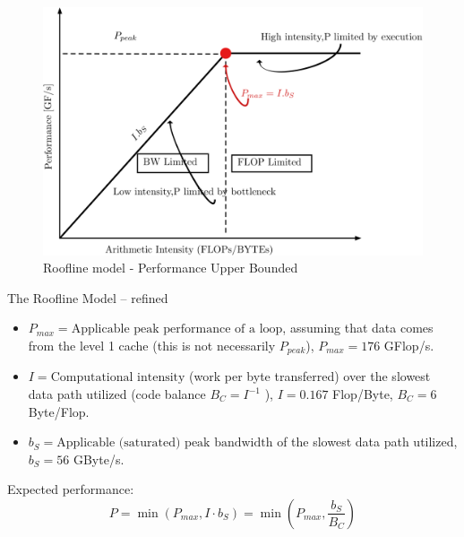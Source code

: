 \documentclass{article}
\begin{document}
\begin{figure}[!htp]
    \centering
    \includegraphics[width=.6\textwidth, height=.4\textwidth]{Roofline_0_1.png}
    \caption{Roofline model - Performance Upper Bounded}
    \label{Roofline_0_1}
\end{figure}
 The Roofline Model – refined
\begin{itemize}
\item $P_{max} = \mbox{Applicable peak performance of a loop}$, assuming that data comes from the level 1 cache (this is not necessarily $P_{peak}$), $P_{max} = 176$ GFlop/s.
\item $I = \mbox{Computational intensity}$ (work per byte transferred) over the slowest data path utilized (code balance $B_C = I^{-1}$ ), $I = 0.167$ Flop/Byte, $B_C = 6$ Byte/Flop.
\item $b_S = \mbox{Applicable (saturated) peak bandwidth}$ of the slowest data path utilized, $b_S = 56$ GByte/s.
\end{itemize}
Expected performance:
\begin{equation*}
 P = \min \left(P_{max} , I \cdot b_S\right) = \min \left(P_{max}, \frac{b_S}{B_C}\right)
\end{equation*}
\end{document}

